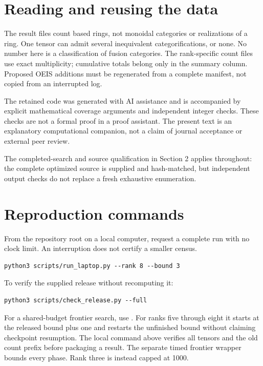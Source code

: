 \documentclass[11pt,a4paper]{article}
\theoremstyle{definition}\newtheorem{definition}[theorem]{Definition}\newtheorem{remark}[theorem]{Remark}
\begin{document}
\section{Reading and reusing the data}
The result files count based rings, not monoidal categories or realizations of
a ring. One tensor can admit several inequivalent categorifications, or none.
No number here is a classification of fusion categories. The rank-specific
count files use exact multiplicity; cumulative totals belong only in the
summary column. Proposed OEIS additions must be regenerated from a complete
manifest, not copied from an interrupted log.

The retained code was generated with AI assistance and is accompanied by explicit
mathematical coverage arguments and independent integer checks. These checks
are not a formal proof in a proof assistant. The present text is an explanatory
computational companion, not a claim of journal acceptance or external peer review.

The completed-search and source qualification in Section 2 applies throughout: the complete optimized source is supplied and hash-matched, but independent output checks do not replace a fresh exhaustive enumeration.

\par\noindent\begin{minipage}{\linewidth}
\section{Reproduction commands}
From the repository root on a local computer, request a complete run with no clock limit. An interruption does not certify a smaller census.
\par\noindent\begin{minipage}{\linewidth}
\begin{lstlisting}
python3 scripts/run_laptop.py --rank 8 --bound 3
\end{lstlisting}
\end{minipage}\par
To verify the supplied release without recomputing it:
\par\noindent\begin{minipage}{\linewidth}
\begin{lstlisting}
python3 scripts/check_release.py --full
\end{lstlisting}
\end{minipage}\par
For a shared-budget frontier search, use . For ranks five through eight it starts at the released bound plus one and restarts the unfinished bound without claiming checkpoint resumption. The local command above verifies all tensors and the old count prefix before packaging a result. The separate timed frontier wrapper bounds every phase. Rank three is instead capped at 1000.

\end{minipage}\par
\end{document}
